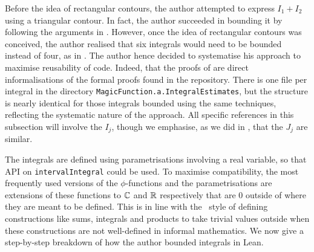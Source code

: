 Before the idea of rectangular contours, the author attempted to express $I_1 + I_2$ using a triangular contour. In fact, the author succeeded in bounding it by following the arguments in \cite{Viazovska8}. However, once the idea of rectangular contours was conceived, the author realised that six integrals would need to be bounded instead of four, as in \cite{Viazovska8}. The author hence decided to systematise his approach to maximise reusability of code. Indeed, that the proofs of  are direct informalisations of the formal proofs found in the repository. There is one file per integral in the directory \lstinline|MagicFunction.a.IntegralEstimates|, but the structure is nearly identical for those integrals bounded using the same techniques, reflecting the systematic nature of the approach. All specific references in this subsection will involve the $I_j$, though we emphasise, as we did in , that the $J_j$ are similar.

The integrals are defined using parametrisations involving a real variable, so that API on \lstinline|intervalIntegral| could be used. To maximise compatibility, the most frequently used versions of the $\phi$-functions and the parametrisations are extensions of these functions to $\mathbb{C}$ and $\mathbb{R}$ respectively that are $0$ outside of where they are meant to be defined. This is in line with the \mathlib\ style of defining constructions like sums, integrals and products to take trivial values outside when these constructions are not well-defined in informal mathematics. We now give a step-by-step breakdown of how the author bounded integrals in Lean.

